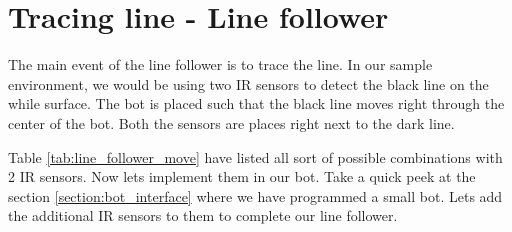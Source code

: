 \section{Tracing line - Line follower}

The main event of the line follower is to trace the line. In our sample environment, we would be using two \ac{IR} sensors to detect the black line on the while surface. The bot is placed such that the black line moves right through the center of the bot. Both the sensors are places right next to the dark line.


Table \ref{tab:line_follower_move} have listed all sort of possible combinations with 2 \ac{IR} sensors. Now lets implement them in our bot. Take a quick peek at the section \ref{section:bot_interface} where we have programmed a small bot. Lets add the additional \ac{IR} sensors to them to complete our line follower.

